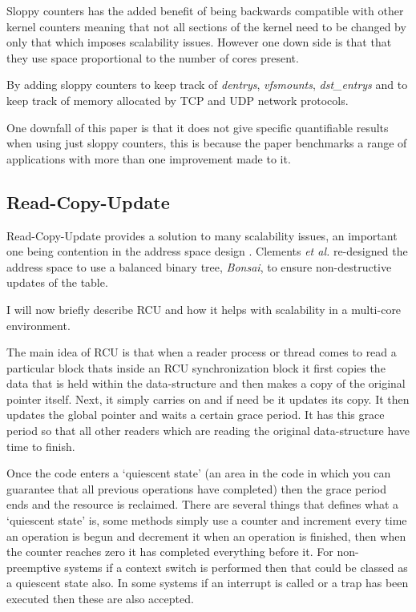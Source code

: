 \documentclass[journal]{IEEEtran}
\begin{document}
Sloppy counters has the added benefit of being backwards compatible with other kernel counters meaning that not all sections of the kernel need to be changed by only that which imposes scalability issues. However one down side is that that they use space proportional to the number of cores present.

By adding sloppy counters to keep track of \emph{dentrys}, \emph{vfsmounts}, \emph{dst\_entrys} and to keep track of memory allocated by TCP and UDP network protocols. 

One downfall of this paper \cite{sloppy-counters} is that it does not give specific quantifiable results when using just sloppy counters, this is because the paper benchmarks a range of applications with more than one improvement made to it.

\subsection{Read-Copy-Update}
Read-Copy-Update provides a solution to many scalability issues, an important one being contention in the address space design \cite{Bonsai}. Clements \emph{et al.} re-designed the address space to use a balanced binary tree, \emph{Bonsai}, to ensure non-destructive updates of the table.

I will now briefly describe RCU and how it helps with scalability in a multi-core environment.

The main idea of RCU is that when a reader process or thread comes to read a particular block thats inside an RCU synchronization block it first copies the data that is held within the data-structure and then makes a copy of the original pointer itself. Next, it simply carries on and if need be it updates its copy. It then updates the global pointer and waits a certain grace period. It has this grace period so that all other readers which are reading the original data-structure have time to finish. 

Once the code enters a `quiescent state' (an area in the code in which you can guarantee that all previous operations have completed) then the grace period ends and the resource is reclaimed. There are several things that defines what a `quiescent state' is, some methods simply use a counter and increment every time an operation is begun and decrement it when an operation is finished, then when the counter reaches zero it has completed everything before it. For non-preemptive systems if a context switch is performed then that could be classed as a quiescent state also. In some systems if an interrupt is called or a trap has been executed then these are also accepted.
\end{document}
